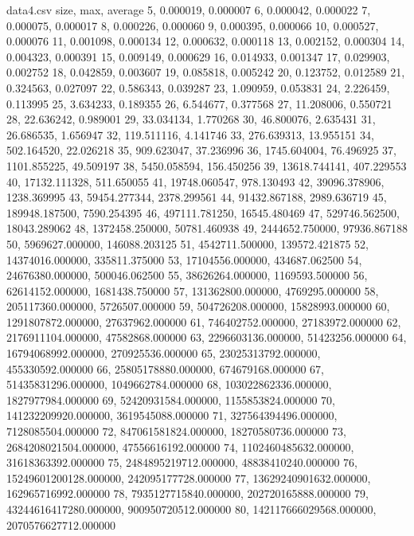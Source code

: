 \documentclass{article}
\begin{document}
\begin{filecontents*}{data4.csv}
	size, max, average
	5, 0.000019, 0.000007
	6, 0.000042, 0.000022
	7, 0.000075, 0.000017
	8, 0.000226, 0.000060
	9, 0.000395, 0.000066
	10, 0.000527, 0.000076
	11, 0.001098, 0.000134
	12, 0.000632, 0.000118
	13, 0.002152, 0.000304
	14, 0.004323, 0.000391
	15, 0.009149, 0.000629
	16, 0.014933, 0.001347
	17, 0.029903, 0.002752
	18, 0.042859, 0.003607
	19, 0.085818, 0.005242
	20, 0.123752, 0.012589
	21, 0.324563, 0.027097
	22, 0.586343, 0.039287
	23, 1.090959, 0.053831
	24, 2.226459, 0.113995
	25, 3.634233, 0.189355
	26, 6.544677, 0.377568
	27, 11.208006, 0.550721
	28, 22.636242, 0.989001
	29, 33.034134, 1.770268
	30, 46.800076, 2.635431
	31, 26.686535, 1.656947
	32, 119.511116, 4.141746
	33, 276.639313, 13.955151
	34, 502.164520, 22.026218
	35, 909.623047, 37.236996
	36, 1745.604004, 76.496925
	37, 1101.855225, 49.509197
	38, 5450.058594, 156.450256
	39, 13618.744141, 407.229553
	40, 17132.111328, 511.650055
	41, 19748.060547, 978.130493
	42, 39096.378906, 1238.369995
	43, 59454.277344, 2378.299561
	44, 91432.867188, 2989.636719
	45, 189948.187500, 7590.254395
	46, 497111.781250, 16545.480469
	47, 529746.562500, 18043.289062
	48, 1372458.250000, 50781.460938
	49, 2444652.750000, 97936.867188
	50, 5969627.000000, 146088.203125
	51, 4542711.500000, 139572.421875
	52, 14374016.000000, 335811.375000
	53, 17104556.000000, 434687.062500
	54, 24676380.000000, 500046.062500
	55, 38626264.000000, 1169593.500000
	56, 62614152.000000, 1681438.750000
	57, 131362800.000000, 4769295.000000
	58, 205117360.000000, 5726507.000000
	59, 504726208.000000, 15828993.000000
	60, 1291807872.000000, 27637962.000000
	61, 746402752.000000, 27183972.000000
	62, 2176911104.000000, 47582868.000000
	63, 2296603136.000000, 51423256.000000
	64, 16794068992.000000, 270925536.000000
	65, 23025313792.000000, 455330592.000000
	66, 25805178880.000000, 674679168.000000
	67, 51435831296.000000, 1049662784.000000
	68, 103022862336.000000, 1827977984.000000
	69, 52420931584.000000, 1155853824.000000
	70, 141232209920.000000, 3619545088.000000
	71, 327564394496.000000, 7128085504.000000
	72, 847061581824.000000, 18270580736.000000
	73, 2684208021504.000000, 47556616192.000000
	74, 1102460485632.000000, 31618363392.000000
	75, 2484895219712.000000, 48838410240.000000
	76, 15249601200128.000000, 242095177728.000000
	77, 13629240901632.000000, 162965716992.000000
	78, 7935127715840.000000, 202720165888.000000
	79, 43244616417280.000000, 900950720512.000000
	80, 142117666029568.000000, 2070576627712.000000
\end{filecontents*}
\end{document}

